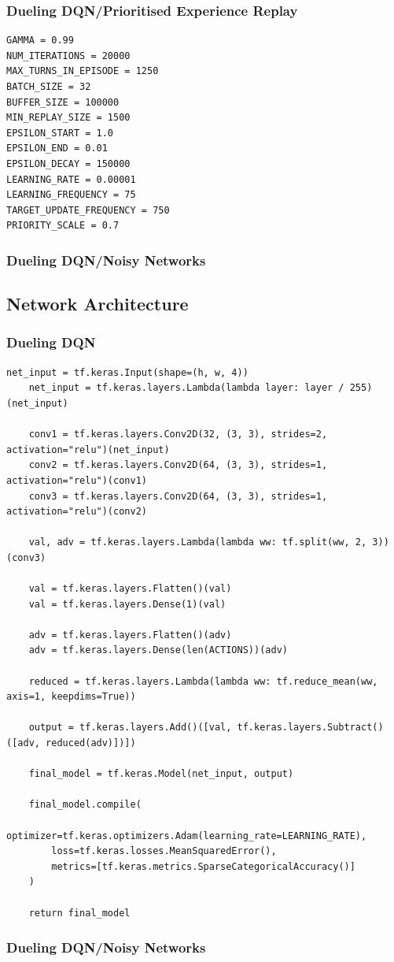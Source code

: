 \documentclass[12pt,a4paper]{article}
\begin{document}
    \subsubsection{Dueling DQN/Prioritised Experience Replay}
    \begin{lstlisting}[label={lst:ddqnperhyperparameters}]
GAMMA = 0.99
NUM_ITERATIONS = 20000
MAX_TURNS_IN_EPISODE = 1250
BATCH_SIZE = 32
BUFFER_SIZE = 100000
MIN_REPLAY_SIZE = 1500
EPSILON_START = 1.0
EPSILON_END = 0.01
EPSILON_DECAY = 150000
LEARNING_RATE = 0.00001
LEARNING_FREQUENCY = 75
TARGET_UPDATE_FREQUENCY = 750
PRIORITY_SCALE = 0.7
    \end{lstlisting}

    \subsubsection{Dueling DQN/Noisy Networks}

    \subsection{Network Architecture}\label{subsec:network-architecture}
    \subsubsection{Dueling DQN}
    \begin{lstlisting}[label={lst:dueling}]
    net_input = tf.keras.Input(shape=(h, w, 4))
    net_input = tf.keras.layers.Lambda(lambda layer: layer / 255)(net_input)

    conv1 = tf.keras.layers.Conv2D(32, (3, 3), strides=2, activation="relu")(net_input)
    conv2 = tf.keras.layers.Conv2D(64, (3, 3), strides=1, activation="relu")(conv1)
    conv3 = tf.keras.layers.Conv2D(64, (3, 3), strides=1, activation="relu")(conv2)

    val, adv = tf.keras.layers.Lambda(lambda ww: tf.split(ww, 2, 3))(conv3)

    val = tf.keras.layers.Flatten()(val)
    val = tf.keras.layers.Dense(1)(val)

    adv = tf.keras.layers.Flatten()(adv)
    adv = tf.keras.layers.Dense(len(ACTIONS))(adv)

    reduced = tf.keras.layers.Lambda(lambda ww: tf.reduce_mean(ww, axis=1, keepdims=True))

    output = tf.keras.layers.Add()([val, tf.keras.layers.Subtract()([adv, reduced(adv)])])

    final_model = tf.keras.Model(net_input, output)

    final_model.compile(
        optimizer=tf.keras.optimizers.Adam(learning_rate=LEARNING_RATE),
        loss=tf.keras.losses.MeanSquaredError(),
        metrics=[tf.keras.metrics.SparseCategoricalAccuracy()]
    )

    return final_model
    \end{lstlisting}

    \subsubsection{Dueling DQN/Noisy Networks}
\end{document}
